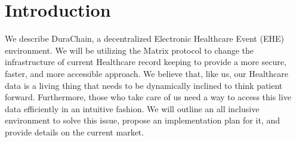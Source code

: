 \documentclass[letterpaper]{article}
\begin{document}



\section{Introduction}
We describe DuraChain, a decentralized Electronic Healthcare Event (EHE) environment. We will be utilizing the Matrix protocol to change the infrastructure of current Healthcare record keeping to provide a more secure, faster, and more accessible approach. We believe that, like us, our Healthcare data is a living thing that needs to be dynamically inclined to think patient forward. Furthermore, those who take care of us need a way to access this live data efficiently in an intuitive fashion. We will outline an all inclusive environment to solve this issue, propose an implementation plan for it, and provide details on the current market.
%
\end{document}
